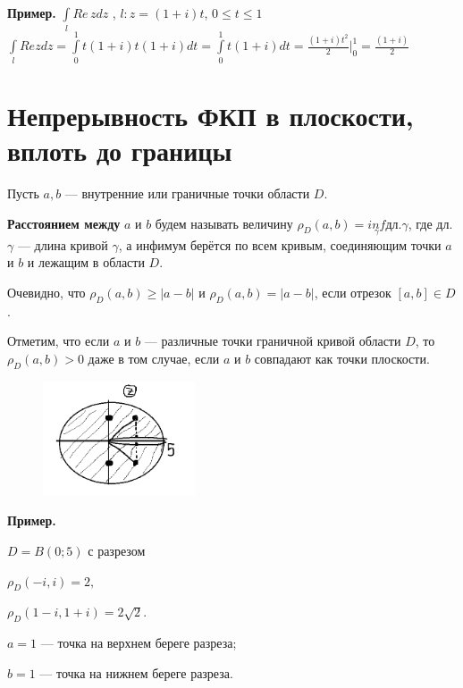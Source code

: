 \documentclass[a4paper, 12pt]{report}
\begin{document}
\\
\\ \textbf{Пример.}
\quad \( \int\limits_l Re\, z dz\) , \(l:z=(1+i)t\),  \(0\leqslant t\leqslant 1\)
\\  \(\int\limits_l Re z dz = \int\limits_0^1 t(1+i)t (1+i)dt = \int\limits_0^1 t(1+i)dt=\frac{(1+i)t^2}{2} |_0^1 = \frac{(1+i)}{2} \)



\section{Непрерывность ФКП в плоскости, вплоть до границы}
Пусть $a, b$ --- внутренние или граничные точки области $D$. \par\bigskip
\textbf{Расстоянием между} $a$ и $b$ будем называть величину $\rho_D(a, b) = \underset{\gamma}{inf} \text{дл.} \gamma$, где дл. $\gamma$ --- длина кривой $\gamma$, а инфимум берётся по всем кривым, соединяющим точки $a$ и $b$ и лежащим в области $D$.
\par\bigskip
Очевидно, что $\rho_D(a, b) \geq |a - b|$ и $\rho_D(a, b) = |a - b|$, если отрезок $[a, b] \in D$.
\par\bigskip
Отметим, что если $a$ и $b$ --- различные точки граничной кривой области $D$, то $\rho_D(a, b) > 0$ даже в том случае, если $a$ и $b$ совпадают как точки плоскости.

\begin{figure} 
    \vspace{-4ex}
    \includegraphics[width=0.4\textwidth]{49-50D.png}
\end{figure}
\oar\bigskip
\textbf{Пример.} 
\par\bigskip

$D = B(0; 5)$ с разрезом 

$\rho_D(-i, i) = 2, $

$\rho_D(1-i, 1+i) = 2 \sqrt{2}$.

$a = 1$ --- точка на верхнем береге разреза;

$b = 1$ --- точка на нижнем береге разреза.
\end{document}
